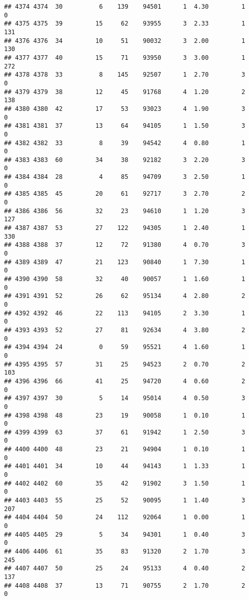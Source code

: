 \documentclass[
]{article}
\begin{document}
\begin{verbatim}
## 4374 4374  30          6    139    94501      1  4.30         1        0
## 4375 4375  39         15     62    93955      3  2.33         1      131
## 4376 4376  34         10     51    90032      3  2.00         1      130
## 4377 4377  40         15     71    93950      3  3.00         1      272
## 4378 4378  33          8    145    92507      1  2.70         3        0
## 4379 4379  38         12     45    91768      4  1.20         2      138
## 4380 4380  42         17     53    93023      4  1.90         3        0
## 4381 4381  37         13     64    94105      1  1.50         3        0
## 4382 4382  33          8     39    94542      4  0.80         1        0
## 4383 4383  60         34     38    92182      3  2.20         3        0
## 4384 4384  28          4     85    94709      3  2.50         1        0
## 4385 4385  45         20     61    92717      3  2.70         2        0
## 4386 4386  56         32     23    94610      1  1.20         3      127
## 4387 4387  53         27    122    94305      1  2.40         1      330
## 4388 4388  37         12     72    91380      4  0.70         3        0
## 4389 4389  47         21    123    90840      1  7.30         1        0
## 4390 4390  58         32     40    90057      1  1.60         1        0
## 4391 4391  52         26     62    95134      4  2.80         2        0
## 4392 4392  46         22    113    94105      2  3.30         1        0
## 4393 4393  52         27     81    92634      4  3.80         2        0
## 4394 4394  24          0     59    95521      4  1.60         1        0
## 4395 4395  57         31     25    94523      2  0.70         2      103
## 4396 4396  66         41     25    94720      4  0.60         2        0
## 4397 4397  30          5     14    95014      4  0.50         3        0
## 4398 4398  48         23     19    90058      1  0.10         1        0
## 4399 4399  63         37     61    91942      1  2.50         3        0
## 4400 4400  48         23     21    94904      1  0.10         1        0
## 4401 4401  34         10     44    94143      1  1.33         1        0
## 4402 4402  60         35     42    91902      3  1.50         1        0
## 4403 4403  55         25     52    90095      1  1.40         3      207
## 4404 4404  50         24    112    92064      1  0.00         1        0
## 4405 4405  29          5     34    94301      1  0.40         3        0
## 4406 4406  61         35     83    91320      2  1.70         3      245
## 4407 4407  50         25     24    95133      4  0.40         2      137
## 4408 4408  37         13     71    90755      2  1.70         2        0

\end{verbatim}
\end{document}
